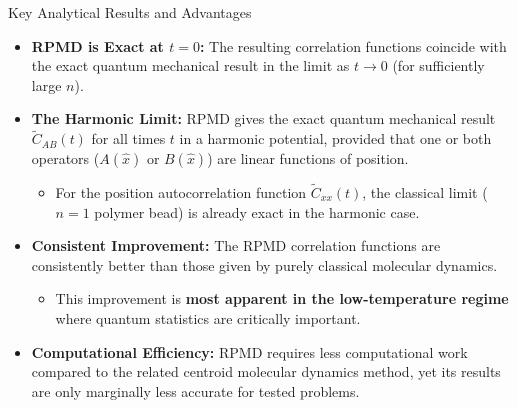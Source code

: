 \begin{frame}{Key Analytical Results and Advantages}

\begin{itemize}
    \item \textbf{RPMD is Exact at $t=0$:} The resulting correlation functions coincide with the exact quantum mechanical result in the limit as $t \to 0$ (for sufficiently large $n$).
    
    \item \textbf{The Harmonic Limit:} RPMD gives the exact quantum mechanical result $\tilde{C}_{AB}(t)$ for all times $t$ in a harmonic potential, provided that one or both operators ($A(\hat{x})$ or $B(\hat{x})$) are linear functions of position.
    \begin{itemize}
        \item For the position autocorrelation function $\tilde{C}_{xx}(t)$, the classical limit ($n=1$ polymer bead) is already exact in the harmonic case.
    \end{itemize}
    
    \item \textbf{Consistent Improvement:} The RPMD correlation functions are consistently better than those given by purely classical molecular dynamics.
    \begin{itemize}
        \item This improvement is \textbf{most apparent in the low-temperature regime} where quantum statistics are critically important.
    \end{itemize}
    
    \item \textbf{Computational Efficiency:} RPMD requires less computational work compared to the related centroid molecular dynamics method, yet its results are only marginally less accurate for tested problems.
\end{itemize}
\end{frame}

